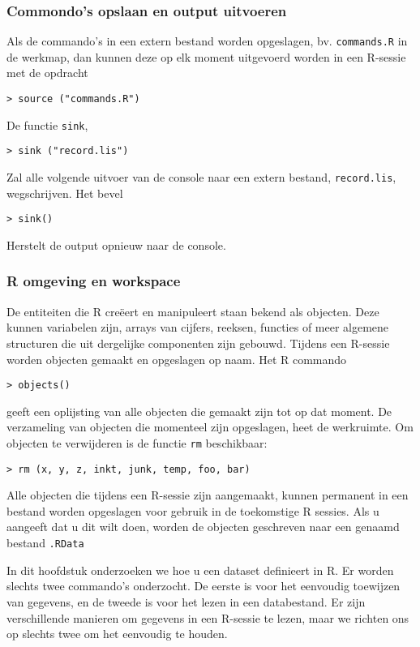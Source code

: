 \subsubsection{Commondo's opslaan en output uitvoeren}
Als de commando's in een extern bestand worden opgeslagen, bv. \texttt{commands.R} in de werkmap, dan kunnen deze op elk moment uitgevoerd worden in een R-sessie met de opdracht
\begin{lstlisting}
> source ("commands.R")
\end{lstlisting}
De functie \texttt{sink},
\begin{lstlisting}
> sink ("record.lis")
\end{lstlisting}
Zal alle volgende uitvoer van de console naar een extern bestand, \texttt{record.lis}, wegschrijven. Het bevel
\begin{lstlisting}
> sink()
\end{lstlisting}
Herstelt de output  opnieuw naar de console.

\subsubsection{R omgeving en workspace}
De entiteiten die R cre\"eert en manipuleert staan ​​bekend als objecten. Deze kunnen variabelen zijn, arrays
van cijfers, reeksen, functies of meer algemene structuren die uit dergelijke componenten zijn gebouwd.
Tijdens een R-sessie worden objecten gemaakt en opgeslagen op naam.
Het R commando
\begin{lstlisting}
> objects()
\end{lstlisting}
geeft een oplijsting van alle objecten die gemaakt zijn tot op dat moment.
De verzameling van objecten die momenteel zijn opgeslagen, heet de werkruimte.
Om objecten te verwijderen is de functie \texttt{rm} beschikbaar:
\begin{lstlisting}
> rm (x, y, z, inkt, junk, temp, foo, bar)
\end{lstlisting}
Alle objecten die tijdens een R-sessie zijn aangemaakt, kunnen permanent in een bestand worden opgeslagen voor gebruik in de toekomstige
R sessies. Als u aangeeft dat u dit wilt doen, worden de objecten geschreven naar een genaamd bestand \texttt{.RData}


In dit hoofdstuk onderzoeken we hoe u een dataset definieert in R. Er worden slechts twee commando's onderzocht. De eerste is voor het eenvoudig toewijzen van gegevens, en de tweede is voor het lezen in een databestand. Er zijn verschillende manieren om gegevens in een R-sessie te lezen, maar we richten ons op slechts twee om het eenvoudig te houden.
